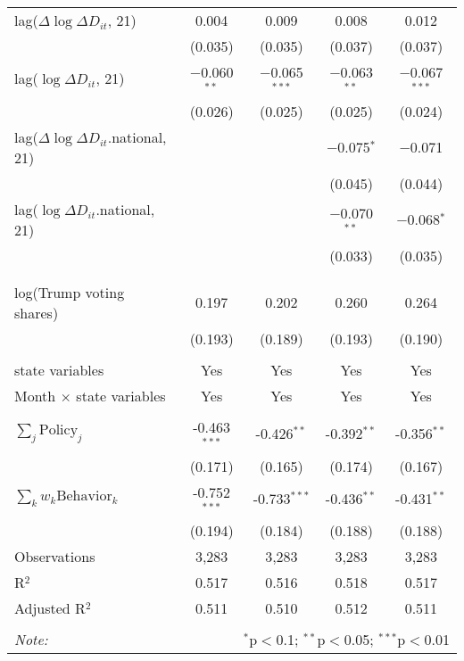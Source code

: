 \begin{tabular}{@{\extracolsep{1pt}}lcccc}
  lag($\Delta \log \Delta D_{it}$, 21) & 0.004 & 0.009 & 0.008 & 0.012 \\ 
  & (0.035) & (0.035) & (0.037) & (0.037) \\ 
  lag($\log \Delta D_{it}$, 21) & $-$0.060$^{**}$ & $-$0.065$^{***}$ & $-$0.063$^{**}$ & $-$0.067$^{***}$ \\ 
  & (0.026) & (0.025) & (0.025) & (0.024) \\ 
  lag($\Delta \log \Delta D_{it}$.national, 21) &  &  & $-$0.075$^{*}$ & $-$0.071 \\ 
  &  &  & (0.045) & (0.044) \\ 
  lag($\log \Delta D_{it}$.national, 21) &  &  & $-$0.070$^{**}$ & $-$0.068$^{*}$ \\ 
  &  &  & (0.033) & (0.035) \\ 
   &  &  &  &  \\ 
  &  &  &  &  \\ 
  log(Trump voting shares) & 0.197 & 0.202 & 0.260 & 0.264 \\ 
  & (0.193) & (0.189) & (0.193) & (0.190) \\ 
 \hline \\[-1.8ex] 
state variables & Yes & Yes & Yes & Yes \\ 
Month $\times$ state variables & Yes & Yes & Yes & Yes \\ 
\hline \\[-1.8ex] 
$\sum_j \mathrm{Policy}_j$ & -0.463$^{***}$ & -0.426$^{**}$ & -0.392$^{**}$ & -0.356$^{**}$ \\ 
 & (0.171) & (0.165) & (0.174) & (0.167) \\ 
$\sum_k w_k \mathrm{Behavior}_k$ & -0.752$^{***}$ & -0.733$^{***}$ & -0.436$^{**}$ & -0.431$^{**}$ \\ 
 & (0.194) & (0.184) & (0.188) & (0.188) \\ 
Observations & 3,283 & 3,283 & 3,283 & 3,283 \\ 
R$^{2}$ & 0.517 & 0.516 & 0.518 & 0.517 \\ 
Adjusted R$^{2}$ & 0.511 & 0.510 & 0.512 & 0.511 \\ 
\hline 
\hline \\[-1.8ex] 
\textit{Note:}  & \multicolumn{4}{r}{$^{*}$p$<$0.1; $^{**}$p$<$0.05; $^{***}$p$<$0.01} \\ 
\end{tabular} 